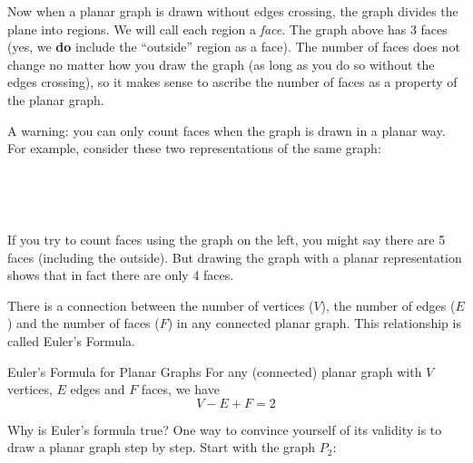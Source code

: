 \documentclass[12pt]{article}
\begin{document}
Now when a planar graph is drawn without edges crossing, the graph divides the plane into regions.  We will call each region a {\em face}.  The graph above has 3 faces (yes, we \textbf{do} include the ``outside'' region as a face).  The number of faces does not change no matter how you draw the graph (as long as you do so without the edges crossing), so it makes sense to ascribe the number of faces as a property of the planar graph.

A warning: you can only count faces when the graph is drawn in a planar way.  For example, consider these two representations of the same graph:

\begin{center}
 ~ \hfill
  \hfill
  \hfill ~
\end{center}

If you try to count faces using the graph on the left, you might say there are 5 faces (including the outside).  But drawing the graph with a planar representation shows that in fact there are only 4 faces.

There is a connection between the number of vertices ($V$), the number of edges ($E$) and the number of faces ($F$) in any connected planar graph.  This relationship is called Euler's Formula.

\begin{defbox}{Euler's Formula for Planar Graphs}
For any (connected) planar graph with $V$ vertices, $E$ edges and $F$ faces, we have
\[V-E + F = 2\]
\end{defbox}

Why is Euler's formula true?  One way to convince yourself of its validity is to draw a planar graph step by step.  Start with the graph $P_2$:

\begin{center}
\end{center}
\end{document}
